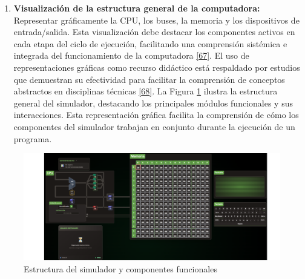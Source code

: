 \documentclass[12pt,oneside]{templates/unerthesis}
\providecommand{\tightlist}{%
  \setlength{\itemsep}{0pt}\setlength{\parskip}{0pt}}
\begin{document}
\begin{enumerate}
\def\labelenumi{\arabic{enumi}.}
\tightlist
\item
  \textbf{Visualización de la estructura general de la computadora:}
  Representar gráficamente la CPU, los buses, la memoria y los dispositivos de entrada/salida. Esta visualización debe destacar los componentes activos en cada etapa del ciclo de ejecución, facilitando una comprensión sistémica e integrada del funcionamiento de la computadora \protect\hyperlink{ref-w3c_accessibility_2021}{{[}67{]}}. El uso de representaciones gráficas como recurso didáctico está respaldado por estudios que demuestran su efectividad para facilitar la comprensión de conceptos abstractos en disciplinas técnicas \protect\hyperlink{ref-sorva2013visualizations}{{[}68{]}}. La Figura \ref{fig:diagramasimulador} ilustra la estructura general del simulador, destacando los principales módulos funcionales y sus interacciones. Esta representación gráfica facilita la comprensión de cómo los componentes del simulador trabajan en conjunto durante la ejecución de un programa.
\end{enumerate}

\begin{figure}

{\centering \includegraphics[width=0.9\linewidth]{images/estructurasimulador} 

}

\caption{Estructura del simulador y componentes funcionales}\label{fig:diagramasimulador}
\end{figure}
\end{document}
